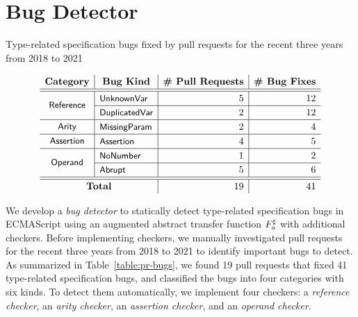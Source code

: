 \section{Bug Detector}\label{sec:checker}

\begin{table}
  \centering
  \caption{Type-related specification bugs fixed by pull requests for the recent
  three years from 2018 to 2021}
  \label{table:pr-bugs}
  \vspace*{-1em}
  \[
\renewcommand{\arraystretch}{1.2}
    \begin{array}{c|l|r|r}
      \multicolumn{1}{c|}{\textbf{Category}} &
      \multicolumn{1}{c|}{\textbf{Bug Kind}} &
      \multicolumn{1}{c|}{\textbf{\# Pull Requests}} &
      \multicolumn{1}{c}{\textbf{\# Bug Fixes}}\\
      \hline \hline

      \multirow{2}{*}{\stextsf{\footnotesize Reference}}
      & \stextsf{\footnotesize UnknownVar} & 5 & 12\\\cline{2-4}
      & \stextsf{\footnotesize DuplicatedVar} & 2 & 12\\\hline

      \multirow{1}{*}{\stextsf{\footnotesize Arity}}
      & \stextsf{\footnotesize MissingParam} & 2 & 4\\\hline

      \multirow{1}{*}{\stextsf{\footnotesize Assertion}}
      & \stextsf{\footnotesize Assertion} & 4 & 5\\\hline

      \multirow{2}{*}{\stextsf{\footnotesize Operand}}
      & \stextsf{\footnotesize NoNumber} & 1 & 2\\\cline{2-4}
      & \stextsf{\footnotesize Abrupt} & 5 & 6\\\hline \hline

      \multicolumn{2}{c|}{\textbf{Total}} & 19 & 41\\

    \end{array}
  \]
  \vspace*{-1.5em}
\end{table}

We develop a \textit{bug detector} to statically detect type-related
specification bugs in ECMAScript using an augmented abstract transfer function
${F}^\sharp_a$ with additional checkers.  Before implementing checkers, we manually
investigated pull requests for the recent three years from 2018 to 2021 to identify
important bugs to detect.  As summarized in Table~\ref{table:pr-bugs},
we found 19 pull requests that fixed 41 type-related specification bugs,
and classified the bugs into four categories with six kinds.
To detect them automatically, we implement four checkers:
a \textit{reference checker}, an \textit{arity checker},
an \textit{assertion checker}, and an \textit{operand checker}.

